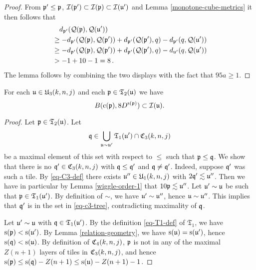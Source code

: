 {\begin{proof}
    From ${\mathfrak p}' \le {\mathfrak p}$, ${\mathcal{I}}({\mathfrak p}') \subset {\mathcal{I}}({\mathfrak p}) \subset {\mathcal{I}}({\mathfrak u}')$ and Lemma \ref{monotone-cube-metrics} it then follows that
    \begin{align*}
        &\quad d_{{\mathfrak p}'}({\mathcal{Q}}({\mathfrak p}), {\mathcal{Q}}({\mathfrak u}'))\\
        &\ge -d_{{\mathfrak p}'}({\mathcal{Q}}({\mathfrak p}), {\mathcal{Q}}({\mathfrak p}')) + d_{{\mathfrak p}'}({\mathcal{Q}}({\mathfrak p}'), q) - d_{{\mathfrak p}'}(q, {\mathcal{Q}}({\mathfrak u}'))\\
        &\ge -d_{{\mathfrak p}'}({\mathcal{Q}}({\mathfrak p}), {\mathcal{Q}}({\mathfrak p}')) + d_{{\mathfrak p}'}({\mathcal{Q}}({\mathfrak p}'), q) - d_{{\mathfrak u}'}(q, {\mathcal{Q}}({\mathfrak u}'))\\
        &> -1 + 10 - 1 = 8\,.
    \end{align*}
    The lemma follows by combining the two displays with the fact that $95 a \ge 1$.
\end{proof}

\begin{lemma}
    \label{forest-inner}
    For each ${\mathfrak u}\in {\mathfrak U}_3(k,n,j)$
    and each ${\mathfrak p} \in \mathfrak{T}_2({\mathfrak u})$
    we have
    \begin{equation}
        B({\mathrm{c}}({\mathfrak p}), 8 D^{{\mathrm{s}}({\mathfrak p})}) \subset {\mathcal{I}}({\mathfrak u}).
    \end{equation}
\end{lemma}

\begin{proof}
    Let ${\mathfrak p} \in \mathfrak{T}_2({\mathfrak u})$. Let
    \begin{equation}
        \label{eq-c3-tree}
        {\mathfrak q} \in \bigcup_{{\mathfrak u} \sim {\mathfrak u}'} \mathfrak{T}_1({\mathfrak u}') \cap {\mathfrak C}_3(k,n,j)
    \end{equation}
    be a maximal element of this set with respect to $\le$ such that ${\mathfrak p} \le {\mathfrak q}$.
    We show that there is no ${\mathfrak q}' \in {\mathfrak C}_3(k,n,j)$ with ${\mathfrak q} \le {\mathfrak q}'$ and ${\mathfrak q} \ne {\mathfrak q}'$. Indeed, suppose ${\mathfrak q}'$ was such a tile.
    By \eqref{eq-C3-def} there exists ${\mathfrak u}'' \in {\mathfrak U}_1(k,n,j)$ with $2{\mathfrak q}' \lesssim {\mathfrak u}''$. Then we have in particular by Lemma \ref{wiggle-order-1} that $10 {\mathfrak p} \lesssim {\mathfrak u}''$. Let ${\mathfrak u}' \sim {\mathfrak u}$ be such that ${\mathfrak p} \in \mathfrak{T}_1({\mathfrak u}')$.  By definition of $\sim$, we have ${\mathfrak u}' \sim {\mathfrak u}''$, hence ${\mathfrak u} \sim {\mathfrak u}''$. This implies that ${\mathfrak q}'$ is in the set in \eqref{eq-c3-tree}, contradicting maximality of ${\mathfrak q}$.

    Let ${\mathfrak u}' \sim {\mathfrak u}$ with ${\mathfrak q} \in \mathfrak{T}_1({\mathfrak u}')$. By the definition \eqref{eq-T1-def} of $\mathfrak{T}_1$, we have ${\mathrm{s}}({\mathfrak p}) < {\mathrm{s}}({\mathfrak u}')$. By Lemma \ref{relation-geometry}, we have ${\mathrm{s}}({\mathfrak u}) = {\mathrm{s}}({\mathfrak u}')$, hence ${\mathrm{s}}({\mathfrak q}) < {\mathrm{s}}({\mathfrak u})$. By definition of ${\mathfrak C}_4(k,n,j)$, ${\mathfrak p}$ is not in any of the maximal $Z(n+1)$ layers of tiles in ${\mathfrak C}_3(k,n,j)$, and hence ${\mathrm{s}}({\mathfrak p}) \le {\mathrm{s}}({\mathfrak q}) - Z(n+1) \le {\mathrm{s}}({\mathfrak u}) - Z(n+1) - 1$.


\end{proof}}
